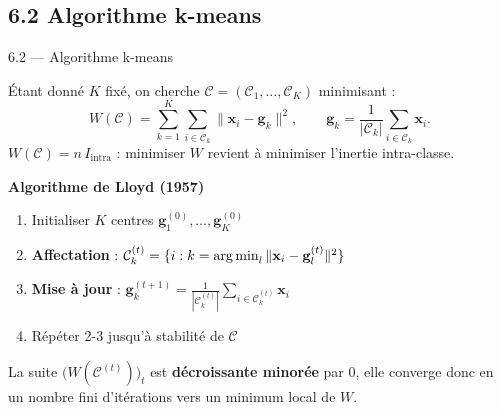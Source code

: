 \subsection{6.2 Algorithme k-means}
\begin{frame}{6.2 — Algorithme k-means}
\begin{definition}
Étant donné $K$ fixé, on cherche $\mathcal{C} = (\mathcal{C}_1, \ldots, \mathcal{C}_K)$ minimisant :
\[
W(\mathcal{C}) = \sum_{k=1}^K \sum_{i \in \mathcal{C}_k} \|\mathbf{x}_i - \mathbf{g}_k\|^2,
\qquad
\mathbf{g}_k = \frac{1}{|\mathcal{C}_k|}\sum_{i \in \mathcal{C}_k} \mathbf{x}_i.
\]
$W(\mathcal{C}) = n \, I_{\text{intra}}$ : minimiser $W$ revient à minimiser
l'inertie intra-classe.
\end{definition}

\textbf{Algorithme de Lloyd (1957)}\\[0.1cm]
\begin{enumerate}\small
  \item Initialiser $K$ centres $\mathbf{g}_1^{(0)}, \ldots, \mathbf{g}_K^{(0)}$
  \item \textbf{Affectation} : $\mathcal{C}_k^{(t)} = \{i : k = \operatorname*{arg\,min}_l \|\mathbf{x}_i - \mathbf{g}_l^{(t)}\|^2\}$
  \item \textbf{Mise à jour} : $\mathbf{g}_k^{(t+1)} = \frac{1}{|\mathcal{C}_k^{(t)}|}\sum_{i \in \mathcal{C}_k^{(t)}} \mathbf{x}_i$
  \item Répéter 2-3 jusqu'à stabilité de $\mathcal{C}$
\end{enumerate}

\begin{theorem}[Convergence]
La suite $\bigl(W(\mathcal{C}^{(t)})\bigr)_t$ est \textbf{décroissante minorée} par 0,
elle converge donc en un nombre fini d'itérations vers un \alert{minimum local}
de $W$.
\end{theorem}
\end{frame}

